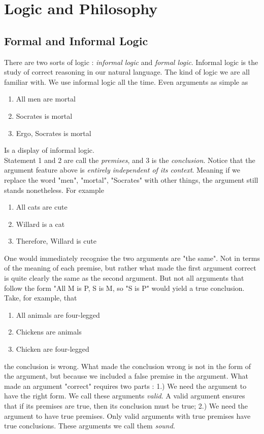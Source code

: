 \chapter{Logic and Philosophy}
    \section{Formal and Informal Logic}
    There are two sorts of logic : \textit{informal logic} and \textit{formal logic}. Informal logic is the study of correct reasoning in our natural language. The kind of logic we are all familiar with. We use informal logic all the time. Even arguments as simple as 
    \begin{enumerate}
        \item All men are mortal
        \item Socrates is mortal 
        \item Ergo, Socrates is mortal
    \end{enumerate}
    Is a display of informal logic.\\
    Statement 1 and 2 are call the \textit{premises}, and 3 is the \textit{conclusion}.
    Notice that the argument feature above is \textit{entirely independent of its context}. Meaning if we replace the word "men", "mortal", "Socrates" with other things, the argument still stands nonetheless. For example
    \begin{enumerate}
        \item All cats are cute 
        \item Willard is a cat 
        \item Therefore, Willard is cute
    \end{enumerate}
    One would immediately recognise the two arguments are "the same". Not in terms of the meaning of each premise, but rather what made the first argument correct is quite clearly the same as the second argument. But not all arguments that follow the form "All M is P, S is M, so "S is P" would yield a true conclusion. Take, for example, that 
    \begin{enumerate}
        \item All animals are four-legged
        \item Chickens are animals 
        \item Chicken are four-legged
    \end{enumerate}
    the conclusion is wrong. What made the conclusion wrong is not in the form of the argument, but because we included a false premise in the argument. What made an argument "correct" requires two parts : 1.) We need the argument to have the right form. We call these arguments \textit{valid}. A valid argument ensures that if its premises are true, then its conclusion must be true; 2.) We need the argument to have true premises. Only valid arguments with true premises have true conclusions. These arguments we call them \textit{sound}.\\
